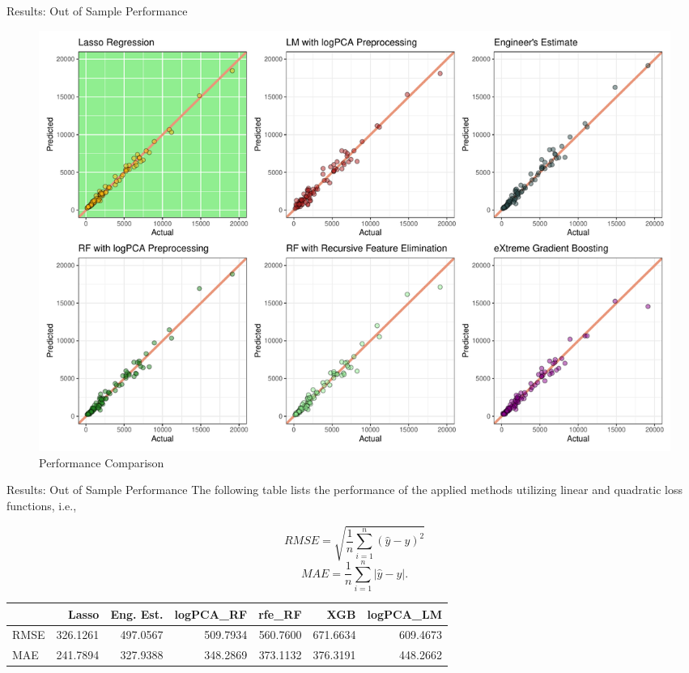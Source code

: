 \documentclass[
  11pt,
  ignorenonframetext,
]{beamer}
\begin{document}
\begin{frame}{Results: Out of Sample Performance}
\protect\hypertarget{results-out-of-sample-performance}{}
\begin{figure}

{\centering \includegraphics[width=0.9\linewidth]{./../figures/percomp_pres} 

}

\caption{Performance Comparison}\label{fig:unnamed-chunk-5}
\end{figure}
\end{frame}

\begin{frame}{Results: Out of Sample Performance}
\protect\hypertarget{results-out-of-sample-performance-1}{}
The following table lists the performance of the applied methods
utilizing linear and quadratic loss functions, i.e.,

\[ RMSE = \sqrt{\frac{1}{n}\sum_{i = 1}^n (\hat{y} - y)^2} \]
\[  MAE = \frac{1}{n}\sum_{i = 1}^n |\hat{y} - y|. \]

\begin{table}
\centering\begingroup\fontsize{7}{9}\selectfont

\begin{tabular}{l|r|r|r|r|r|r}
\hline
  & Lasso & Eng. Est. & logPCA\_RF & rfe\_RF & XGB & logPCA\_LM\\
\hline
RMSE & 326.1261 & 497.0567 & 509.7934 & 560.7600 & 671.6634 & 609.4673\\
\hline
MAE & 241.7894 & 327.9388 & 348.2869 & 373.1132 & 376.3191 & 448.2662\\
\hline
\end{tabular}
\endgroup{}
\end{table}
\end{frame}
\end{document}
